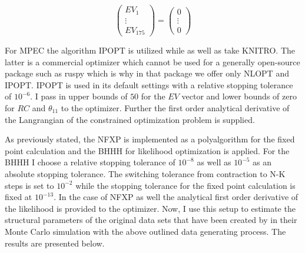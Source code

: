 \begin{equation*}
	\begin{pmatrix} EV_1 \\ \vdots \\ EV_{175} \end{pmatrix} = \begin{pmatrix} 0 \\ \vdots \\ 0 \end{pmatrix}
\end{equation*}

For MPEC the algorithm IPOPT is utilized while \citeauthor{Iskhakov.2016} as well as \citeauthor{Su.Judd.2012} take KNITRO. The latter is a commercial optimizer which cannot be used for a generally open-source package such as ruspy which is why in that package we offer only NLOPT and IPOPT. IPOPT is used in its default settings with a relative stopping tolerance of $10^{-6}$. I pass in upper bounds of $50$ for the $EV$ vector and lower bounds of zero for $RC$ and $\theta_{11}$ to the optimizer. Further the first order analytical derivative of the Langrangian of the constrained optimization problem is supplied.

As previously stated, the NFXP is implemented as a polyalgorithm for the fixed point calculation and the BHHH for likelihood optimization is applied. For the BHHH I choose a relative stopping tolerance of $10^{-8}$ as well as $10^{-5}$ as an absolute stopping tolerance. The switching tolerance from contraction to N-K steps is set to $10^{-2}$ while the stopping tolerance for the fixed point calculation is fixed at $10^{-13}$. In the case of NFXP as well the analytical first order derivative of the likelihood is provided to the optimizer. Now, I use this setup to estimate the structural parameters of the original data sets that have been created by \citeauthor{Iskhakov.2016} in their Monte Carlo simulation with the above outlined data generating process. The results are presented below.\paragraph{}

